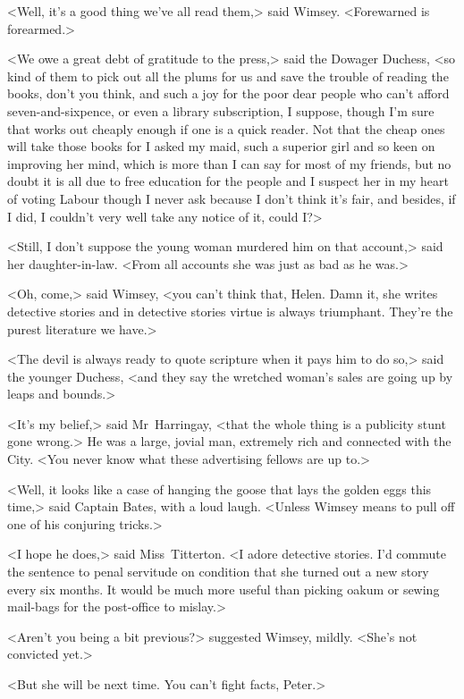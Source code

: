 <Well, it's a good thing we've all read them,> said Wimsey. <Forewarned is forearmed.>

<We owe a great debt of gratitude to the press,> said the Dowager Duchess, <so kind of them to pick out all the plums for us and save the trouble of reading the books, don't you think, and such a joy for the poor dear people who can't afford seven-and-sixpence, or even a library subscription, I suppose, though I'm sure that works out cheaply enough if one is a quick reader. Not that the cheap ones will take those books for I asked my maid, such a superior girl and so keen on improving her mind, which is more than I can say for most of my friends, but no doubt it is all due to free education for the people and I suspect her in my heart of voting Labour though I never ask because I don't think it's fair, and besides, if I did, I couldn't very well take any notice of it, could I?>

<Still, I don't suppose the young woman murdered him on that account,> said her daughter-in-law. <From all accounts she was just as bad as he was.>

<Oh, come,> said Wimsey, <you can't think that, Helen. Damn it, she writes detective stories and in detective stories virtue is always triumphant. They're the purest literature we have.>

<The devil is always ready to quote scripture when it pays him to do so,> said the younger Duchess, <and they say the wretched woman's sales are going up by leaps and bounds.>

<It's my belief,> said Mr~Harringay, <that the whole thing is a publicity stunt gone wrong.> He was a large, jovial man, extremely rich and connected with the City. <You never know what these advertising fellows are up to.>

<Well, it looks like a case of hanging the goose that lays the golden eggs this time,> said Captain Bates, with a loud laugh. <Unless Wimsey means to pull off one of his conjuring tricks.>

<I hope he does,> said Miss~Titterton. <I adore detective stories. I'd commute the sentence to penal servitude on condition that she turned out a new story every six months. It would be much more useful than picking oakum or sewing mail-bags for the post-office to mislay.>

<Aren't you being a bit previous?> suggested Wimsey, mildly. <She's not convicted yet.>

<But she will be next time. You can't fight facts, Peter.>

